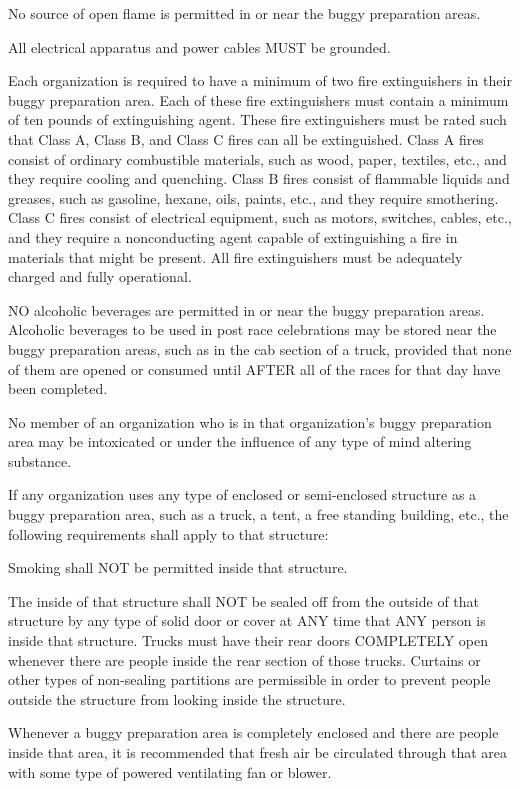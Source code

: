 No source of open flame is permitted in or near the buggy preparation areas.

All electrical apparatus and power cables MUST be grounded.

Each organization is required to have a minimum of two fire extinguishers in their buggy preparation area. Each of these fire extinguishers must contain a minimum of ten pounds of extinguishing agent. These fire extinguishers must be rated such that Class A, Class B, and Class C fires can all be extinguished. Class A fires consist of ordinary combustible materials, such as wood, paper, textiles, etc., and they require cooling and quenching. Class B fires consist of flammable liquids and greases, such as gasoline, hexane, oils, paints, etc., and they require smothering. Class C fires consist of electrical equipment, such as motors, switches, cables, etc., and they require a nonconducting agent capable of extinguishing a fire in materials that might be present. All fire extinguishers must be adequately charged and fully operational.

NO alcoholic beverages are permitted in or near the buggy preparation areas. Alcoholic beverages to be used in post race celebrations may be stored near the buggy preparation areas, such as in the cab section of a truck, provided that none of them are opened or consumed until AFTER all of the races for that day have been completed.

No member of an organization who is in that organization's buggy preparation area may be intoxicated or under the influence of any type of mind altering substance.

If any organization uses any type of enclosed or semi-enclosed structure as a buggy preparation area, such as a truck, a tent, a free standing building, etc., the following requirements shall apply to that structure:

Smoking shall NOT be permitted inside that structure.

The inside of that structure shall NOT be sealed off from the outside of that structure by any type of solid door or cover at ANY time that ANY person is inside that structure. Trucks must have their rear doors COMPLETELY open whenever there are people inside the rear section of those trucks. Curtains or other types of non-sealing partitions are permissible in order to prevent people outside the structure from looking inside the structure.

Whenever a buggy preparation area is completely enclosed and there are people inside that area, it is recommended that fresh air be circulated through that area with some type of powered ventilating fan or blower.

